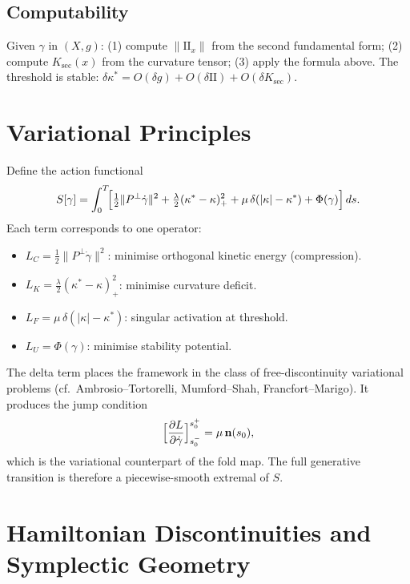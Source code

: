 \documentclass[14pt,a4paper]{extarticle}
\begin{document}
\subsection{Computability}

Given $\gamma$ in $(X, g)$:
(1) compute $\|\mathrm{II}_x\|$ from the second fundamental form;
(2) compute $K_\mathrm{sec}(x)$ from the curvature tensor;
(3) apply the formula above.
The threshold is stable:
$\delta\kappa^* = O(\delta g) + O(\delta\mathrm{II}) +
O(\delta K_\mathrm{sec})$.

\section{Variational Principles}
\label{sec:variational}

Define the action functional
\[
  S[\gamma] = \int_0^T \!\Bigl[
    \tfrac{1}{2}\|P^\perp \dot\gamma\|^2
    + \tfrac{\lambda}{2}(\kappa^* - \kappa)_+^2
    + \mu\,\delta(|\kappa| - \kappa^*)
    + \Phi(\gamma)
  \Bigr]\,ds.
\]
Each term corresponds to one operator:
\begin{itemize}[leftmargin=2em]
  \item $L_C = \tfrac{1}{2}\|P^\perp\dot\gamma\|^2$:
    minimise orthogonal kinetic energy (compression).
  \item $L_K = \tfrac{\lambda}{2}(\kappa^* - \kappa)_+^2$:
    minimise curvature deficit.
  \item $L_F = \mu\,\delta(|\kappa| - \kappa^*)$:
    singular activation at threshold.
  \item $L_U = \Phi(\gamma)$: minimise stability potential.
\end{itemize}

The delta term places the framework in the class of free-discontinuity
variational problems (cf.\ Ambrosio--Tortorelli, Mumford--Shah,
Francfort--Marigo).
It produces the jump condition
\[
  \Bigl[\frac{\partial L}{\partial\dot\gamma}\Bigr]_{s_0^-}^{s_0^+}
  = \mu\,\mathbf{n}(s_0),
\]
which is the variational counterpart of the fold map.
The full generative transition is therefore a piecewise-smooth
extremal of $S$.

\section{Hamiltonian Discontinuities and Symplectic Geometry}
\label{sec:hamiltonian}
\end{document}
